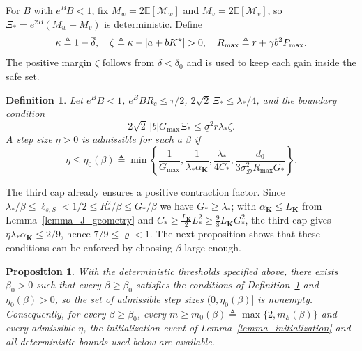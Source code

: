 \documentclass[letterpaper, 10 pt, conference]{ieeeconf}
\newcommand{\E}{\mathbb{E}}
\newcommand{\bK}{\mathbf{K}}
\newcommand{\cD}{\mathcal{D}}
\newcommand{\cE}{\mathcal{E}}
\newcommand{\cM}{\mathcal{M}}
\newcommand{\slo}{\underline{\sigma}}
\newtheorem{proposition}{Proposition}
\newtheorem{definition}{Definition}
\newcommand{\Lemm}{Lemma}
\newcommand{\Defn}{Definition}
\begin{document}
For $B$ with $e^BB<1$, fix $M_w=2\E[\cM_w]$ and $M_v=2\E[\cM_v]$, so $\Xi_{\ast}=e^{2B}(M_w+M_v)$ is deterministic. Define
\begin{equation}\label{eq_boundary_constants}
    \kappa\triangleq1-\overline\delta,\quad
    \zeta\triangleq\kappa-|a+bK^{\star}|>0,\quad
    R_{\max}\triangleq r+\gamma b^2P_{\max}. \vspace{-0.4cm}
\end{equation}
The positive margin $\zeta$ follows from $\delta<\delta_0$ and is used to keep each gain inside the safe set.

\begin{definition}\label{definition_admissible_step_sizes}
    Let $e^{B} B < 1$, $e^{B} B R_{c} \le {\tau}/{2}$, $2\sqrt{2}\,\Xi_{\ast} \le {\lambda_\ast}/{4}$, and the boundary condition
    \begin{equation}\label{eq_boundary_regime}
       2\sqrt2\,|b|G_{\max}\Xi_{\ast}
          \le\slo^2 r\lambda_{\ast}\zeta.
    \end{equation}
    A step size $\eta>0$ is \emph{admissible} for such a $\beta$ if
    \begin{equation} \label{eq_admissible_step}
    \eta {\le} \eta_{0}(\beta) {\triangleq}
        \min \! \left\{ \!
        \frac{1}{G_{\max}},\frac{1}{\lambda_{\ast}\alpha_{\bK}},
        \frac{\lambda_{\ast}}{4C_{\ast}},
        \frac{d_0}{3\sigma_{\cD}^2R_{\max}G_{\ast}}
        \!\right\}.
    \end{equation}
\end{definition}
 
The third cap already ensures a positive contraction factor. Since $\lambda_{\ast}/\beta\le\ell_{s,S}<1/2\le R_{\ast}^{2}/\beta\le G_{\ast}/\beta$ we have $G_{\ast}\ge\lambda_{\ast}$; with $\alpha_{\bK}\le L_{\bK}$ from \Lemm~\ref{lemma_J_geometry} and $C_{\ast}\ge\tfrac{L_{\bK}}{2}L_{\ast}^{2}\ge\tfrac{9}{8}L_{\bK}G_{\ast}^{2}$, the third cap gives $\eta\lambda_{\ast}\alpha_{\bK}\le2/9$, hence $7/9\le\varrho<1$. The next proposition shows that these conditions can be enforced by choosing $\beta$ large enough.
 
\begin{proposition} \label{proposition_benign_width_choice}
    With the deterministic thresholds specified above, there exists $\beta_{0} > 0$ such that every $\beta \ge \beta_{0}$ satisfies the conditions of \Defn~\ref{definition_admissible_step_sizes} and $\eta_{0}(\beta)>0$, so the set of admissible step sizes $(0, \eta_{0}(\beta)]$ is nonempty. Consequently, for every $\beta \ge \beta_{0}$, every $m \ge m_{0}(\beta)\triangleq\max\{2,m_{\cE}(\beta)\}$ and every admissible $\eta$, the initialization event of \Lemm~\ref{lemma_initialization} and all deterministic bounds used below are available.
\end{proposition}
 
\end{document}
